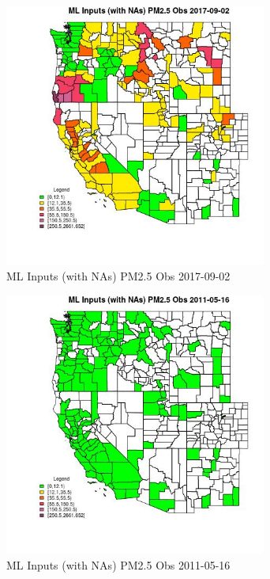 \begin{figure} 
\centering  
\includegraphics[width=0.77\textwidth]{Code_Outputs/Report_ML_input_PM25_Step4_part_e_de_duplicated_aves_compiled_2019-05-20wNAs_CountyPM25_ObsMean2017-09-02.jpg} 
\caption{\label{fig:Report_ML_input_PM25_Step4_part_e_de_duplicated_aves_compiled_2019-05-20wNAsCountyPM25_ObsMean2017-09-02}ML Inputs (with NAs) PM2.5 Obs 2017-09-02} 
\end{figure} 
 

\begin{figure} 
\centering  
\includegraphics[width=0.77\textwidth]{Code_Outputs/Report_ML_input_PM25_Step4_part_e_de_duplicated_aves_compiled_2019-05-20wNAs_CountyPM25_ObsMean2011-05-16.jpg} 
\caption{\label{fig:Report_ML_input_PM25_Step4_part_e_de_duplicated_aves_compiled_2019-05-20wNAsCountyPM25_ObsMean2011-05-16}ML Inputs (with NAs) PM2.5 Obs 2011-05-16} 
\end{figure} 
 

